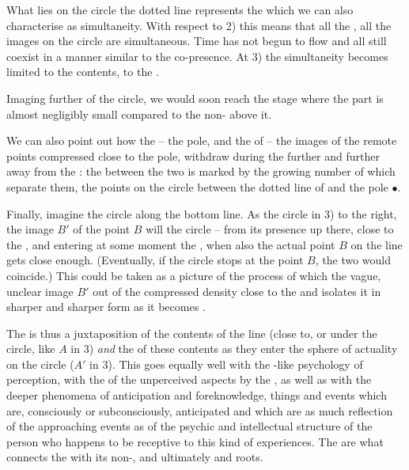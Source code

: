 What lies on the circle  the dotted line represents the
 which we can also characterise as simultaneity. With respect to
2) this means that all the , all the images on the circle are
simultaneous.  Time has not begun to flow and all  still
coexist in a manner similar to the  co-presence.  At 3) the
simultaneity becomes limited to the  contents, to the \hoa.


\pa %
Imaging further  of the circle, we would soon reach the 
stage where the  part is almost negligibly small compared to the 
non- above it.

We can also point out how the  -- the pole, and the  
of  -- the 
 images of the remote points compressed close to the pole, withdraw during 
the  further and further away from the : the 
 between the two is marked by the growing number of  
which separate them, the points on the circle between the dotted line 
of  and the pole $\bullet$.

\label{pa:density} Finally, imagine the circle  along the bottom line. 
As the circle in 3)  to the right, the image $B'$ of the point
$B$ will  the circle -- from its presence up there, close
to the , and entering at some moment the \hoa, when also
the actual point $B$ on the line gets close enough.  (Eventually, if the
circle stops at the point $B$, the two would coincide.)  This could be
taken as a picture of the process of  which
 the vague, unclear image $B'$ out of the compressed density
close to the  and isolates it in sharper and sharper form
as it becomes . 

The  is thus a juxtaposition
of the  contents of the line (close to, or under the
circle, like $A$ in 3) {\em and} the  of these contents as they
enter the sphere of actuality on the circle  ($A'$ 
in 3). This goes equally well with the -like psychology 
of perception, with the  of the unperceived aspects by 
the , as well as with the deeper phenomena of  anticipation
and foreknowledge, things and events which are, consciously or 
subconsciously, anticipated and which are as much reflection of the 
approaching events as of the psychic and intellectual structure of the 
person who happens to be receptive to this kind of experiences. The 
are what connects the  with its non-, and ultimately
 and   roots. 

